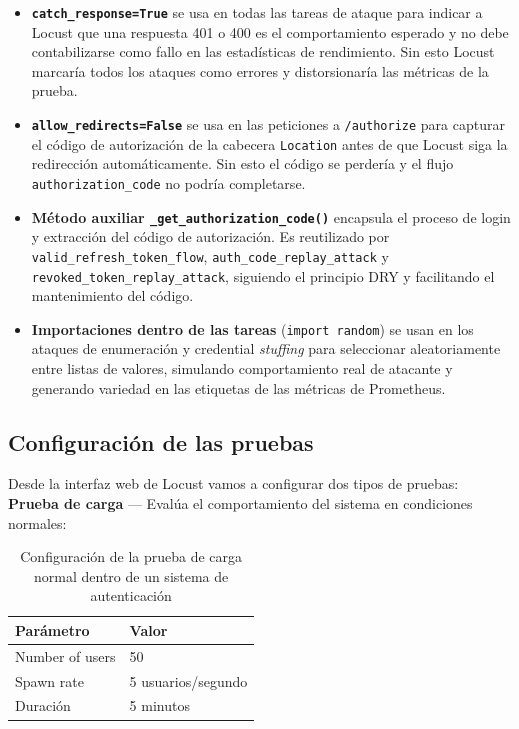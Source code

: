 \documentclass[12pt, a4paper]{article}
\begin{document}
			\begin{itemize}
				\item \textbf{\texttt{catch\_response=True}} se usa en todas las tareas de ataque para indicar a Locust que una respuesta 401 o 400 es el comportamiento esperado y no debe contabilizarse como fallo en las estadísticas de rendimiento. Sin esto Locust
				marcaría todos los ataques como errores y distorsionaría las métricas de la prueba.
				\item \textbf{\texttt{allow\_redirects=False}} se usa en las peticiones a \texttt{/authorize} para capturar el código de autorización de la cabecera \texttt{Location} antes de que Locust siga la redirección automáticamente. Sin esto el código se perdería y el flujo \texttt{authorization\_code} no podría completarse.
				\item \textbf{Método auxiliar \texttt{\_get\_authorization\_code()}} encapsula el proceso de login y extracción del código de autorización. Es reutilizado por \texttt{valid\_refresh\_token\_flow}, \texttt{auth\_code\_replay\_attack} y \texttt{revoked\_token\_replay\_attack}, siguiendo el principio DRY y facilitando el mantenimiento del código.
				\item \textbf{Importaciones dentro de las tareas} (\texttt{import random}) se usan en los ataques de enumeración y credential \textit{stuffing }para seleccionar aleatoriamente	entre listas de valores, simulando comportamiento real de atacante y generando variedad en las etiquetas de las métricas de Prometheus.
			\end{itemize}
			
			
		
		\subsection{Configuración de las pruebas} 
		
		Desde la interfaz web de Locust vamos a configurar dos tipos de pruebas:\\
		
		\textbf{Prueba de carga} — Evalúa el comportamiento del sistema en condiciones
		normales:
		
		\begin{table}[H]
			\centering
			\begin{tabular}{ll}
				\toprule
				\textbf{Parámetro} & \textbf{Valor} \\
				\midrule
				Number of users & 50 \\
				Spawn rate      & 5 usuarios/segundo \\
				Duración        & 5 minutos \\
				\bottomrule
			\end{tabular}
			\caption{Configuración de la prueba de carga normal dentro de un sistema de autenticación}
			\label{Normal}
		\end{table}
		
\end{document}
